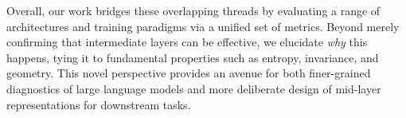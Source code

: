 Overall, our work bridges these overlapping threads by evaluating a range of architectures and training paradigms via a unified set of metrics. Beyond merely confirming that intermediate layers can be effective, we elucidate \emph{why} this happens, tying it to fundamental properties such as entropy, invariance, and geometry. This novel perspective provides an avenue for both finer-grained diagnostics of large language models and more deliberate design of mid-layer representations for downstream tasks.








